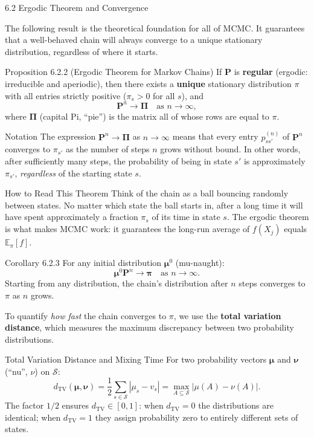 \documentclass[aspectratio=169,10pt]{beamer}
\newcommand{\EE}{\mathbb{E}}
\newcommand{\dTV}{d_{\mathrm{TV}}}
\newcommand{\bfP}{\mathbf{P}}
\newcommand{\bfpi}{\bm{\pi}}
\newcommand{\bfmu}{\bm{\mu}}
\newcommand{\bfv}{\bm{\nu}}
\begin{document}
\begin{frame}[allowframebreaks]{6.2 Ergodic Theorem and Convergence}

The following result is the theoretical foundation for all of MCMC.
It guarantees that a well-behaved chain will always converge to a unique stationary distribution, regardless of where it starts.

\begin{block}{Proposition 6.2.2 (Ergodic Theorem for Markov Chains)}
If $\bfP$ is \textbf{regular} (ergodic: irreducible and aperiodic), then there exists a \textbf{unique} stationary distribution $\pi$ with all entries strictly positive ($\pi_s > 0$ for all $s$), and
\[
  \bfP^n \to \bm{\Pi} \quad \text{as } n \to \infty,
\]
where $\bm{\Pi}$ (capital Pi, ``pie'') is the matrix all of whose rows are equal to $\pi$.
\end{block}

\begin{block}{Notation}
The expression $\bfP^n \to \bm{\Pi}$ as $n \to \infty$ means that every entry $p_{ss'}^{(n)}$ of $\bfP^n$ converges to $\pi_{s'}$ as the number of steps $n$ grows without bound.
In other words, after sufficiently many steps, the probability of being in state $s'$ is approximately $\pi_{s'}$, \emph{regardless} of the starting state $s$.
\end{block}

\begin{alertblock}{How to Read This Theorem}
Think of the chain as a ball bouncing randomly between states.
No matter which state the ball starts in, after a long time it will have spent approximately a fraction $\pi_s$ of its time in state $s$.
The ergodic theorem is what makes MCMC work: it guarantees the long-run average of $f(X_j)$ equals $\EE_\pi[f]$.
\end{alertblock}

\begin{block}{Corollary 6.2.3}
For any initial distribution $\bfmu^0$ (mu-naught):
\[
  \bfmu^0 \bfP^n \to \bfpi \quad \text{as } n \to \infty.
\]
Starting from any distribution, the chain's distribution after $n$ steps converges to $\pi$ as $n$ grows.
\end{block}

\framebreak

To quantify \emph{how fast} the chain converges to $\pi$, we use the \textbf{total variation distance}, which measures the maximum discrepancy between two probability distributions.

\begin{block}{Total Variation Distance and Mixing Time}
For two probability vectors $\bfmu$ and $\bfv$ (``nu'', $\nu$) on $\mathcal{S}$:
\[
  \dTV(\bfmu, \bfv) = \frac{1}{2} \sum_{s \in \mathcal{S}} |\mu_s - v_s| = \max_{A \subseteq \mathcal{S}} |\mu(A) - \nu(A)|.
\]
The factor $1/2$ ensures $\dTV \in [0,1]$: when $\dTV = 0$ the distributions are identical; when $\dTV = 1$ they assign probability zero to entirely different sets of states.


\end{block}
\end{frame}
\end{document}
